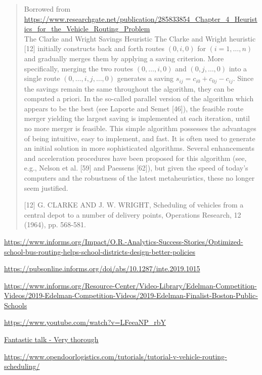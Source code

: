 \begin{quote}
Borrowed from \url{https://www.researchgate.net/publication/285833854_Chapter_4_Heuristics_for_the_Vehicle_Routing_Problem} \\

The Clarke and Wright Savings Heuristic
The Clarke and Wright heuristic [12] initially constructs back and forth routes $(0, i, 0)$ for $(i=1, \ldots, n)$ and gradually merges them by applying a saving criterion. More specifically, merging the two routes $(0, \ldots, i, 0)$ and $(0, j, \ldots, 0)$ into a single route $(0, \ldots, i, j, \ldots, 0)$ generates a saving $s_{i j}=c_{i 0}+c_{0 j}-c_{i j}$. Since the savings remain the same throughout the algorithm, they can be computed a priori. In the so-called parallel version of the algorithm which appears to be the best (see Laporte and Semet [46]), the feasible route merger yielding the largest saving is implemented at each iteration, until no more merger is feasible. This simple algorithm possesses the advantages of being intuitive, easy to implement, and fast. It is often used to generate an initial solution in more sophisticated algorithms. Several enhancements and acceleration procedures have been proposed for this algorithm (see, e.g., Nelson et al. [59] and Paessens [62]), but given the speed of today's computers and the robustness of the latest metaheuristics, these no longer seem justified.

[12] G. CLARKE AND J. W. WRIGHT, Scheduling of vehicles from a central depot to a number of delivery points, Operations Research, 12 (1964), pp. 568-581.
\end{quote}


\begin{resource}
\url{https://www.informs.org/Impact/O.R.-Analytics-Success-Stories/Optimized-school-bus-routing-helps-school-districts-design-better-policies}

\url{https://pubsonline.informs.org/doi/abs/10.1287/inte.2019.1015}

\url{https://www.informs.org/Resource-Center/Video-Library/Edelman-Competition-Videos/2019-Edelman-Competition-Videos/2019-Edelman-Finalist-Boston-Public-Schools}


\url{https://www.youtube.com/watch?v=LFeeaNP_rbY}

\href{https://www.youtube.com/watch?v=BZA_UaX8rs8&t=23s&ab_channel=MERSCognitiveRobotics}{Fantastic talk - Very thorough}

\url{https://www.opendoorlogistics.com/tutorials/tutorial-v-vehicle-routing-scheduling/}
\end{resource}




